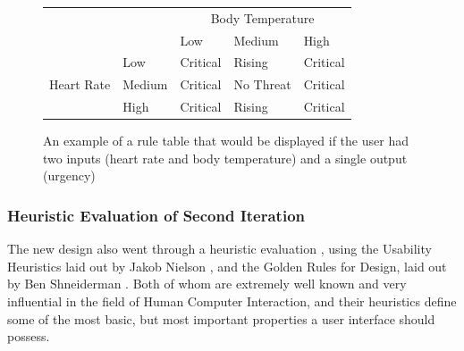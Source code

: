 \begin{figure}[ht!]
\begin{center}
\begin{tabular}{cl|lll}
\multicolumn{2}{c|}{} & \multicolumn{3}{c}{Body Temperature} \\
\multicolumn{2}{c|}{   }	& Low & Medium & High \\
\hline
\multirow{3}{10mm}{Heart Rate}	& Low		& Critical & Rising    & Critical \\
					& Medium	& Critical & No Threat & Critical \\
					& High		& Critical & Rising & Critical \\
\end{tabular}
\end{center}
\vspace{-4mm}
\caption{An example of a rule table that would be displayed if the user had two inputs (heart rate and body temperature) and a single output (urgency)}
\label{fig:ruleTable}
\end{figure}

\subsubsection{Heuristic Evaluation of Second Iteration}
The new design also went through a heuristic evaluation \cite{nielsen1990heuristic}, using the Usability Heuristics laid out by Jakob Nielson \cite{nielsen2005ten}, and the Golden Rules for Design, laid out by Ben Shneiderman \cite{shneiderman2005designing}. Both of whom are extremely well known and very influential in the field of Human Computer Interaction, and their heuristics define some of the most basic, but most important properties a user interface should possess. 

